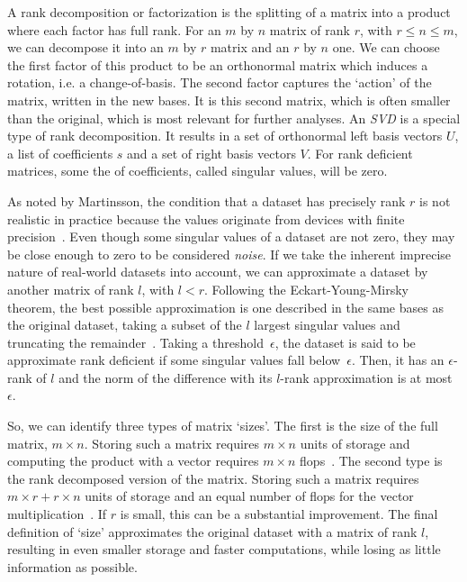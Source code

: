 \documentclass{acm_proc_article-sp}
\begin{document}
A rank decomposition or factorization is the splitting of a matrix into a product where each factor has full rank. For an $m$ by $n$ matrix of rank $r$, with $r \leq n \leq m$, we can decompose it into an $m$ by $r$ matrix and an $r$ by $n$ one. We can choose the first factor of this product to be an orthonormal matrix which induces a rotation, i.e. a change-of-basis. The second factor captures the `action' of the matrix, written in the new bases. It is this second matrix, which is often smaller than the original, which is most relevant for further analyses. An \textit{SVD} is a special type of rank decomposition. It results in a set of orthonormal left basis vectors $U$, a list of coefficients $s$ and a set of right basis vectors $V$. For rank deficient matrices, some the of coefficients, called singular values, will be zero.

As noted by Martinsson, the condition that a dataset has precisely rank $r$ is not realistic in practice because the values originate from devices with finite precision~\cite{Martinsson2016}. Even though some singular values of a dataset are not zero, they may be close enough to zero to be considered \textit{noise}. If we take the inherent imprecise nature of real-world datasets into account, we can approximate a dataset by another matrix of rank $l$, with $l < r$. Following the Eckart-Young-Mirsky theorem, the best possible approximation is one described in the same bases as the original dataset, taking a subset of the $l$ largest singular values and truncating the remainder~\cite{Eckart1936}. Taking a threshold~$\epsilon$, the dataset is said to be approximate rank deficient if some singular values fall below~$\epsilon$. Then, it has an $\epsilon$-rank of $l$ and the norm of the difference with its $l$-rank approximation is at most~$\epsilon$.

So, we can identify three types of matrix `sizes'. The first is the size of the full matrix, $m \times n$. Storing such a matrix requires $m \times n$ units of storage and computing the product with a vector requires $m \times n$ flops~\cite{Martinsson2016}. The second type is the rank decomposed version of the matrix. Storing such a matrix requires $m \times r + r \times n$ units of storage and an equal number of flops for the vector multiplication~\cite{Martinsson2016}. If $r$ is small, this can be a substantial improvement. The final definition of `size' approximates the original dataset with a matrix of rank $l$, resulting in even smaller storage and faster computations, while losing as little information as possible.
\end{document}
